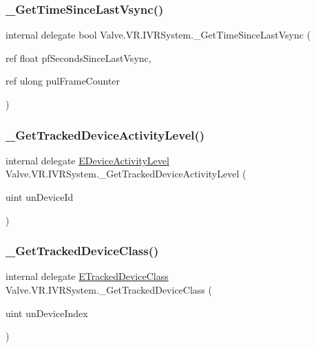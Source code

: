 \mbox{\label{struct_valve_1_1_v_r_1_1_i_v_r_system_ab4843adda277e53c0307051b2ec21cc8}} 
\subsubsection{\texorpdfstring{\_GetTimeSinceLastVsync()}{\_GetTimeSinceLastVsync()}}
{\footnotesize\ttfamily internal delegate bool Valve.\+V\+R.\+I\+V\+R\+System.\+\_\+\+Get\+Time\+Since\+Last\+Vsync (\begin{DoxyParamCaption}\item[{ref float}]{pf\+Seconds\+Since\+Last\+Vsync,  }\item[{ref ulong}]{pul\+Frame\+Counter }\end{DoxyParamCaption})}

\mbox{\label{struct_valve_1_1_v_r_1_1_i_v_r_system_af6da0a3c81f4645a74f3ae34d3c050b6}} 
\subsubsection{\texorpdfstring{\_GetTrackedDeviceActivityLevel()}{\_GetTrackedDeviceActivityLevel()}}
{\footnotesize\ttfamily internal delegate \mbox{\hyperlink{namespace_valve_1_1_v_r_a44a7a02e482d63dc5e0c0851a2ad775e}{E\+Device\+Activity\+Level}} Valve.\+V\+R.\+I\+V\+R\+System.\+\_\+\+Get\+Tracked\+Device\+Activity\+Level (\begin{DoxyParamCaption}\item[{uint}]{un\+Device\+Id }\end{DoxyParamCaption})}

\mbox{\label{struct_valve_1_1_v_r_1_1_i_v_r_system_a012f6620d3faad15d7622c5c53b091e8}} 
\subsubsection{\texorpdfstring{\_GetTrackedDeviceClass()}{\_GetTrackedDeviceClass()}}
{\footnotesize\ttfamily internal delegate \mbox{\hyperlink{namespace_valve_1_1_v_r_aa1a3c2765fe53acb85372a57652c47a1}{E\+Tracked\+Device\+Class}} Valve.\+V\+R.\+I\+V\+R\+System.\+\_\+\+Get\+Tracked\+Device\+Class (\begin{DoxyParamCaption}\item[{uint}]{un\+Device\+Index }\end{DoxyParamCaption})}

